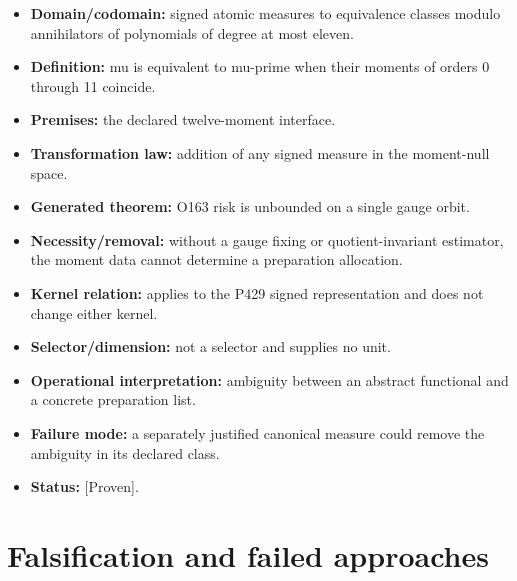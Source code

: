 \documentclass[11pt,a4paper,openany]{report}
\newcommand{\statusProven}{\textcolor{fingreen}{[Proven]}}
\begin{document}
\begin{itemize}
\item 
\textbf{Domain/\allowbreak{}codomain:} signed atomic measures to equivalence classes modulo annihilators of polynomials of degree at most eleven.

\item 
\textbf{Definition:} mu is equivalent to mu-prime when their moments of orders 0 through 11 coincide.

\item 
\textbf{Premises:} the declared twelve-moment interface.

\item 
\textbf{Transformation law:} addition of any signed measure in the moment-null space.

\item 
\textbf{Generated theorem:} O163 risk is unbounded on a single gauge orbit.

\item 
\textbf{Necessity/\allowbreak{}removal:} without a gauge fixing or quotient-invariant estimator, the moment data cannot determine a preparation allocation.

\item 
\textbf{Kernel relation:} applies to the P429 signed representation and does not change either kernel.

\item 
\textbf{Selector/\allowbreak{}dimension:} not a selector and supplies no unit.

\item 
\textbf{Operational interpretation:} ambiguity between an abstract functional and a concrete preparation list.

\item 
\textbf{Failure mode:} a separately justified canonical measure could remove the ambiguity in its declared class.

\item 
\textbf{Status:} \statusProven{}.

\end{itemize}

\chapter{Falsification and failed approaches}
\end{document}
